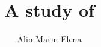 \documentclass[oneside]{thesis}
\title{A study of }
\author{Alin Marin Elena}
\begin{document}
\begin{frontmatter}
  
\end{frontmatter}


\begin{mainmatter}
  
  
  
  
\end{mainmatter}

\begin{appendices}
  
\end{appendices}

\begin{backmatter}
  
\end{backmatter}

\end{document}
